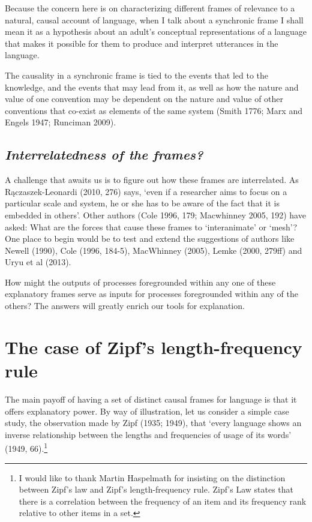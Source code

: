 Because the concern here is on characterizing different frames of 
relevance to a natural, causal account of language, when I talk about a 
synchronic frame I shall mean it as a hypothesis about an adult's 
conceptual representations of a language that makes it possible for them 
to produce and interpret utterances in the language. 



The causality in a synchronic frame is tied to the events that led to 
the knowledge, and the events that may lead from it, as well as how the 
nature and value of one convention may be dependent on the nature and 
value of other conventions that co-exist as elements of the same system 
(Smith 1776; Marx and Engels 1947; Runciman 2009).



\subsection{\textit{Interrelatedness of the frames?}}



A challenge that awaits us is to figure out how these frames are 
interrelated. As R\k{a}czaszek-Leonardi (2010, 276) says, \textquoteleft even if a
\textit{ }researcher aims to focus on a particular scale and system, he 
or she has to be aware of the fact that it is embedded in others'. Other 
authors (Cole 1996, 179; Macwhinney 2005, 192) have asked: What are the 
forces that cause these frames to \textquoteleft interanimate' or \textquoteleft mesh'? One place to 
begin would be to test and extend the suggestions of authors like Newell 
(1990), Cole (1996, 184-5), MacWhinney (2005), Lemke (2000, 279ff) and 
Uryu et al (2013). 



How might the outputs of processes foregrounded within any one of these 
explanatory frames serve as inputs for processes foregrounded within any 
of the others? The answers will greatly enrich our tools for 
explanation.



\section{The case of Zipf's length-frequency rule}


The main payoff of having a set of distinct causal frames for language 
is that it offers explanatory power. By way of illustration, let us 
consider a simple case study, the observation made by Zipf (1935; 1949), 
that \textquoteleft every language shows an inverse relationship between the lengths 
and frequencies of usage of its words' (1949, 66).\footnote{I would like to thank Martin Haspelmath for insisting on the distinction between Zipf's law and Zipf's length-frequency rule. Zipf's Law states that there is a correlation between the frequency of an item and its frequency rank relative to other items in a set.}



